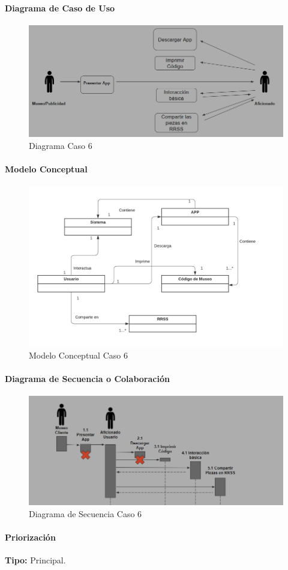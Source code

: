 \paragraph{Diagrama de Caso de Uso}

\begin{figure}[H]
\centerline{\includegraphics[width=15cm]{imgs/CasoUso_6.PNG}}
\caption{Diagrama Caso 6}
\label{fig_6_1}
\end{figure}

\paragraph{Modelo Conceptual}

\begin{figure}[H]
\centerline{\includegraphics[width=15cm]{imgs/ModeloConceptualCaso_6_3.png}}
\caption{Modelo Conceptual Caso 6}
\label{fig_6_2}
\end{figure}

\paragraph{Diagrama de Secuencia o Colaboración}

\begin{figure}[H]
\centerline{\includegraphics[width=15cm]{imgs/CasoUso_6_2.PNG}}
\caption{Diagrama de Secuencia Caso 6}
\label{fig_6_3}
\end{figure}

\paragraph{Priorización}
{\textbf {Tipo:}}
Principal.